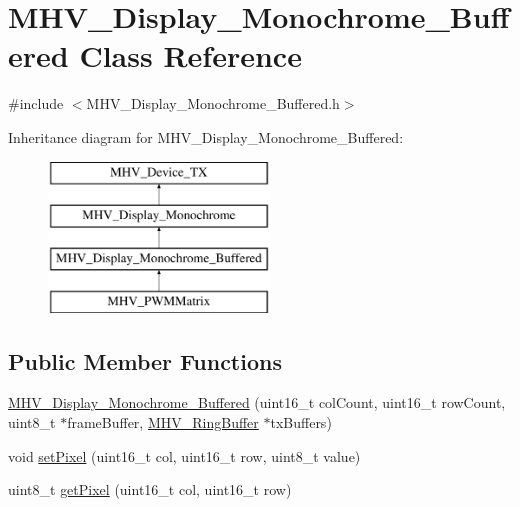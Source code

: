 \hypertarget{class_m_h_v___display___monochrome___buffered}{
\section{\-M\-H\-V\-\_\-\-Display\-\_\-\-Monochrome\-\_\-\-Buffered \-Class \-Reference}
\label{class_m_h_v___display___monochrome___buffered}
}


{\ttfamily \#include $<$\-M\-H\-V\-\_\-\-Display\-\_\-\-Monochrome\-\_\-\-Buffered.\-h$>$}

\-Inheritance diagram for \-M\-H\-V\-\_\-\-Display\-\_\-\-Monochrome\-\_\-\-Buffered\-:\begin{figure}[H]
\begin{center}
\leavevmode
\includegraphics[height=4.000000cm]{class_m_h_v___display___monochrome___buffered}
\end{center}
\end{figure}
\subsection*{\-Public \-Member \-Functions}
\begin{DoxyCompactItemize}
\item 
\hyperlink{class_m_h_v___display___monochrome___buffered_afe84158d5520297439830f2baedc44d6}{\-M\-H\-V\-\_\-\-Display\-\_\-\-Monochrome\-\_\-\-Buffered} (uint16\-\_\-t col\-Count, uint16\-\_\-t row\-Count, uint8\-\_\-t $\ast$frame\-Buffer, \hyperlink{class_m_h_v___ring_buffer}{\-M\-H\-V\-\_\-\-Ring\-Buffer} $\ast$tx\-Buffers)
\item 
void \hyperlink{class_m_h_v___display___monochrome___buffered_afc17261971874f319878629d90f7f426}{set\-Pixel} (uint16\-\_\-t col, uint16\-\_\-t row, uint8\-\_\-t value)
\item 
uint8\-\_\-t \hyperlink{class_m_h_v___display___monochrome___buffered_a134f42819a667a3aafb60a3fd432ef12}{get\-Pixel} (uint16\-\_\-t col, uint16\-\_\-t row)
\end{DoxyCompactItemize}
